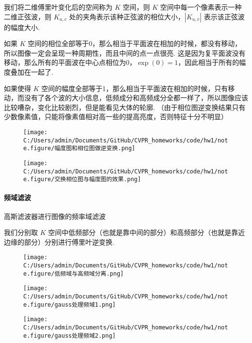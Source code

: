 \documentclass[
]{article}
\begin{document}
我们将二维傅里叶变化后的空间称为 \(K\) 空间，则 \(K\)
空间中每一个像素表示一种二维正弦波，则 \(K_{u,v}\)
处的夹角表示该种正弦波的相位大小，\(|K_{u,v}|\) 表示该正弦波的幅度大小.

如果 \(K\)
空间的相位全部等于0，那么相当于平面波在相加的时候，都没有移动，所以图像一定会呈现一种周期性，而且中间的点一点很亮.
这是因为复平面波没有移动，那么所有的平面波在中心点相位为0，\(\exp(0)=1\)，因此相当于所有的幅度叠加在一起了.

如果使得 \(K\)
空间的幅度全部等于1，那么相当于平面波在相加的时候，只有移动，而没有了各个波的大小信息，低频成分和高频成分全都一样了，所以图像应该比较嘈杂，变化比较剧烈，但是能看见大体的轮廓.
（由于相位图逆变换结果只有少数像素值，只能将像素值相对高一些的提高亮度，否则特征十分不明显）

\begin{figure}
\centering
\texttt{[image: C:/Users/admin/Documents/GitHub/CVPR\_homeworks/code/hw1/note.figure/幅度图和相位图做逆变换.png]}
\caption{}
\end{figure}

\begin{figure}
\centering
\texttt{[image: C:/Users/admin/Documents/GitHub/CVPR\_homeworks/code/hw1/note.figure/交换相位图与幅度图的效果.png]}
\caption{}
\end{figure}

\hypertarget{ux9891ux57dfux6ee4ux6ce2}{%
\paragraph{频域滤波}\label{ux9891ux57dfux6ee4ux6ce2}}

⾼斯滤波器进⾏图像的频率域滤波

我们分别取 \(K\)
空间中低频部分（也就是靠中间的部分）和高频部分（也就是靠近边缘的部分）分别进行傅里叶逆变换.

\begin{figure}
\centering
\texttt{[image: C:/Users/admin/Documents/GitHub/CVPR\_homeworks/code/hw1/note.figure/低频域与高频域分离.png]}
\caption{}
\end{figure}

\begin{figure}
\centering
\texttt{[image: C:/Users/admin/Documents/GitHub/CVPR\_homeworks/code/hw1/note.figure/gauss处理频域1.png]}
\caption{}
\end{figure}

\begin{figure}
\centering
\texttt{[image: C:/Users/admin/Documents/GitHub/CVPR\_homeworks/code/hw1/note.figure/gauss处理频域2.png]}
\caption{}
\end{figure}
\end{document}
